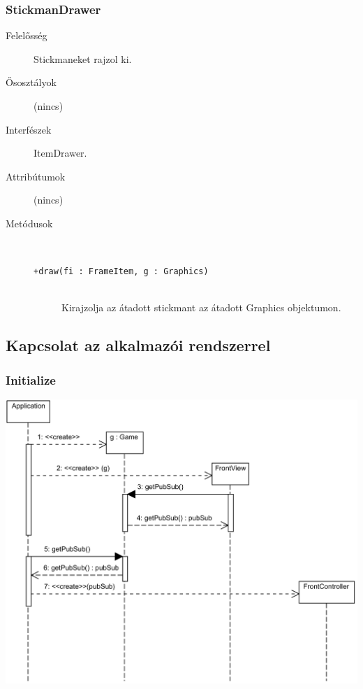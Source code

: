 		\subsubsection{StickmanDrawer}
			\begin{description}

				\item[Felelősség] Stickmaneket rajzol ki.

				\item[Ősosztályok] (nincs)
				\item[Interfészek] ItemDrawer.
				\item[Attribútumok] (nincs)
				\item[Metódusok]$\ $
					\begin{description}
						\item[\texttt{+draw(fi : FrameItem, g : Graphics)}] \hfill \\Kirajzolja az átadott stickmant az átadott Graphics objektumon. 
					\end{description}
			\end{description}

	\clearpage
	\subsection{Kapcsolat az alkalmazói rendszerrel}
		\subsubsection{Initialize}
		    \begin{center}
			    \includegraphics[scale=0.88]{resources/init.png}
		    \end{center}


